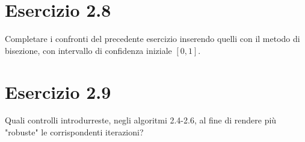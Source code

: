 \section{Esercizio 2.8}
Completare i confronti del precedente esercizio inserendo quelli con il metodo di bisezione, con intervallo di confidenza iniziale $ [0,1]$.
\section{Esercizio 2.9}
Quali controlli introdurreste, negli algoritmi 2.4-2.6, al fine di rendere più "robuste" le corrispondenti iterazioni?

